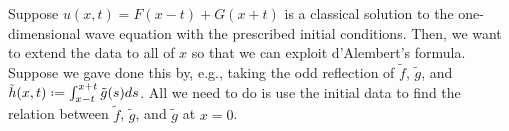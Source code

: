 \begin{solution}

  Suppose \(u(x,t)=F(x-t)+G(x+t)\) is a classical solution to the
  one-dimensional wave equation with the prescribed initial
  conditions. Then, we want to extend the data to all of \(x\) so that we
  can exploit d'Alembert's formula. Suppose we gave done this by, e.g.,
  taking the odd reflection of \(\tilde f\), \(\tilde g\), and
  \(\tilde h(x,t)\defeq \int_{x-t}^{x+t} \tilde g(s)ds\). All we need to do
  is use the initial data to find the relation between \(\tilde f\),
  \(\tilde g\), and \(\tilde g\) at \(x=0\).


\end{solution}
